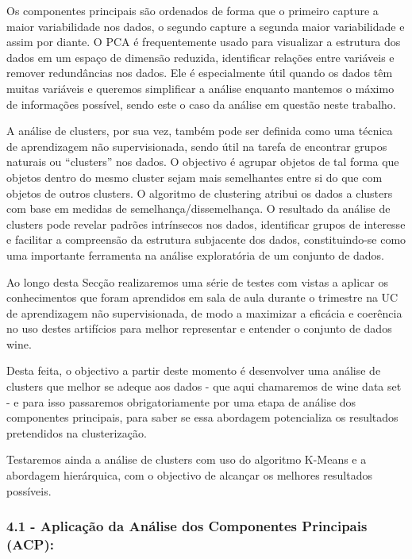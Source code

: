 \documentclass[
  letterpaper,
  DIV=11,
  numbers=noendperiod]{scrartcl}
\begin{document}
Os componentes principais são ordenados de forma que o primeiro capture
a maior variabilidade nos dados, o segundo capture a segunda maior
variabilidade e assim por diante. O PCA é frequentemente usado para
visualizar a estrutura dos dados em um espaço de dimensão reduzida,
identificar relações entre variáveis e remover redundâncias nos dados.
Ele é especialmente útil quando os dados têm muitas variáveis e queremos
simplificar a análise enquanto mantemos o máximo de informações
possível, sendo este o caso da análise em questão neste trabalho.

A análise de clusters, por sua vez, também pode ser definida como uma
técnica de aprendizagem não supervisionada, sendo útil na tarefa de
encontrar grupos naturais ou ``clusters'' nos dados. O objectivo é
agrupar objetos de tal forma que objetos dentro do mesmo cluster sejam
mais semelhantes entre si do que com objetos de outros clusters. O
algoritmo de clustering atribui os dados a clusters com base em medidas
de semelhança/dissemelhança. O resultado da análise de clusters pode
revelar padrões intrínsecos nos dados, identificar grupos de interesse e
facilitar a compreensão da estrutura subjacente dos dados,
constituindo-se como uma importante ferramenta na análise exploratória
de um conjunto de dados.

Ao longo desta Secção realizaremos uma série de testes com vistas a
aplicar os conhecimentos que foram aprendidos em sala de aula durante o
trimestre na UC de aprendizagem não supervisionada, de modo a maximizar
a eficácia e coerência no uso destes artifícios para melhor representar
e entender o conjunto de dados wine.

Desta feita, o objectivo a partir deste momento é desenvolver uma
análise de clusters que melhor se adeque aos dados - que aqui chamaremos
de wine data set - e para isso passaremos obrigatoriamente por uma etapa
de análise dos componentes principais, para saber se essa abordagem
potencializa os resultados pretendidos na clusterização.

Testaremos ainda a análise de clusters com uso do algoritmo K-Means e a
abordagem hierárquica, com o objectivo de alcançar os melhores
resultados possíveis.

\subsubsection{4.1 - Aplicação da Análise dos Componentes Principais
(ACP):}\label{aplicauxe7uxe3o-da-anuxe1lise-dos-componentes-principais-acp}
\end{document}
